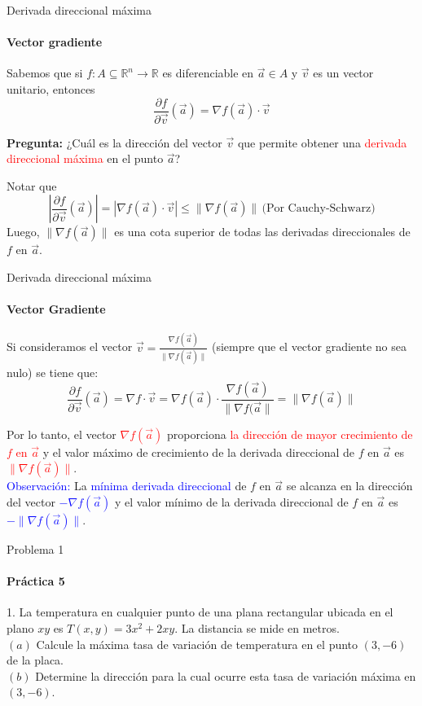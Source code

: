 \documentclass{plantillaPPT}
\begin{document}
\primeraDiapo

\begin{frame}{Derivada direccional máxima}
\framesubtitle{Vector gradiente}

Sabemos que si \(f:A\subseteq\mathbb{R}^n\to\mathbb{R}\) es diferenciable en \(\vec{a}\in A\) y \(\vec{v}\) es un vector unitario, entonces
\[
\frac{\partial f}{\partial \vec{v}}(\vec{a}) = \nabla f(\vec{a})\cdot\vec{v}
\]

\textbf{Pregunta: }¿Cuál es la dirección del vector \(\vec{v}\) que permite obtener una \textcolor{red}{derivada direccional máxima} en el punto \(\vec{a}\)?

Notar que
\[
\left|\frac{\partial f}{\partial \vec{v}}(\vec{a})\right|=|\nabla f(\vec{a})\cdot\vec{v}|\leq\|\nabla f(\vec{a})\|\,\text{(Por Cauchy-Schwarz)}
\]
Luego, \(\|\nabla f(\vec{a})\|\) es una cota superior de todas las derivadas direccionales de \(f\) en \(\vec{a}\).
    
\end{frame}

\begin{frame}{Derivada direccional máxima}
\framesubtitle{Vector Gradiente}

Si consideramos el vector \(\displaystyle\vec{v}=\frac{\nabla f(\vec{a})}{\|\nabla f(\vec{a})\|}\) (siempre que el vector gradiente no sea nulo) se tiene que:
\[
\frac{\partial f}{\partial \vec{v}}(\vec{a})=\nabla f\cdot\vec{v} = \nabla f(\vec{a})\cdot \frac{\nabla f(\vec{a})}{\|\nabla f(\vec{a}\|} = \|\nabla f(\vec{a})\|
\]

Por lo tanto, el vector \textcolor{red}{\(\nabla f(\vec{a})\)} proporciona \textcolor{red}{la dirección de mayor crecimiento de \(f\) en \(\vec{a}\)} y el valor máximo de crecimiento de la derivada direccional de \(f\) en \(\vec{a}\) es \textcolor{red}{\(\|\nabla f(\vec{a})\|\)}.\\[5pt]

\textcolor{blue}{Observación: } La \textcolor{blue}{mínima derivada direccional} de \(f\) en \(\vec{a}\) se alcanza en la dirección del vector \textcolor{blue}{\(-\nabla f(\vec{a})\)} y el valor mínimo de la derivada direccional de \(f\) en \(\vec{a}\) es \textcolor{blue}{\(-\|\nabla f(\vec{a})\|\)}.

\end{frame}

\begin{frame}{Problema 1}
\framesubtitle{Práctica 5}

1. La temperatura en cualquier punto de una plana rectangular ubicada en el plano \(xy\) es \(T(x,y)=3x^2+2xy\). La distancia se mide en metros.\\[5pt]
\((a)\) Calcule la máxima tasa de variación de temperatura en el punto \((3, -6)\) de la placa.\\[2pt]
\((b)\) Determine la dirección para la cual ocurre esta tasa de variación máxima en \((3,-6)\).
    
\end{frame}
\end{document}
